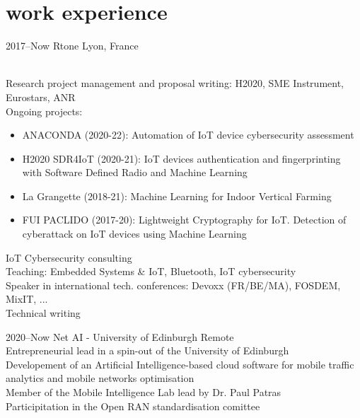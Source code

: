 \documentclass[]{cv-style}          %
\begin{document}
\vspace{0.15cm}
\section{work experience}

\begin{entrylist}
\entry
{2017--Now}
{Rtone}
{Lyon, France}
{\\
Research project management and proposal writing: H2020, SME Instrument, Eurostars, ANR\\
Ongoing projects:
\begin{itemize}
    \item ANACONDA (2020-22): Automation of IoT device cybersecurity assessment
    \item H2020 SDR4IoT (2020-21): IoT devices authentication and fingerprinting with Software Defined Radio and Machine Learning
    \item La Grangette (2018-21): Machine Learning for Indoor Vertical Farming
    \item FUI PACLIDO (2017-20): Lightweight Cryptography for IoT. Detection of cyberattack on IoT devices using Machine Learning
\end{itemize}
IoT Cybersecurity consulting\\
Teaching: Embedded Systems \& IoT, Bluetooth, IoT cybersecurity\\
Speaker in international tech. conferences: Devoxx (FR/BE/MA), FOSDEM, MixIT, ...\\
Technical writing}
\entry
{2020--Now}
{Net AI - University of Edinburgh}
{Remote}
{\\
Entrepreneurial lead in a spin-out of the University of Edinburgh\\
Developement of an Artificial Intelligence-based cloud software for mobile traffic analytics and mobile networks optimisation\\
Member of the Mobile Intelligence Lab lead by Dr. Paul Patras\\
Participitation in the Open RAN standardisation comittee}


\end{entrylist}
\end{document}
